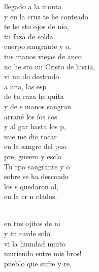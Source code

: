 \begin{cancion}%
	llegado a la monta\\
	y en la cruz te he conteado\\
	te he sto ojos de nio,\\
	tu faza de solda.\\
	cuerpo sangrante y o,\\
	tus manos viejas de anco\\
	no he sto un Cristo de hisria,\\
	vi un do destrodo.\\
	 a una, las esp\\
	de tu caza he quita\\
	y de s manos sangran\\
	arrané los íos cos\\
	y al gar hasta los p,\\
	mie me dio tocar\\
	en la sangre del puo\\
	pre, gueero y escla\\
	Tu rpo sangrante y o\\
	sobre  se ha descoado\\
	los s quedaron al, \\
	en la cr n clados.\\\jump\\
	\begin{chorus}%
	en tus ojitos de ni\\
	y tu carde solo\\
	vi la humdad murio\\
	muriendo entre mis bros!\\
	 pueblo que sufre y re,\\

\end{chorus}
\end{cancion}
